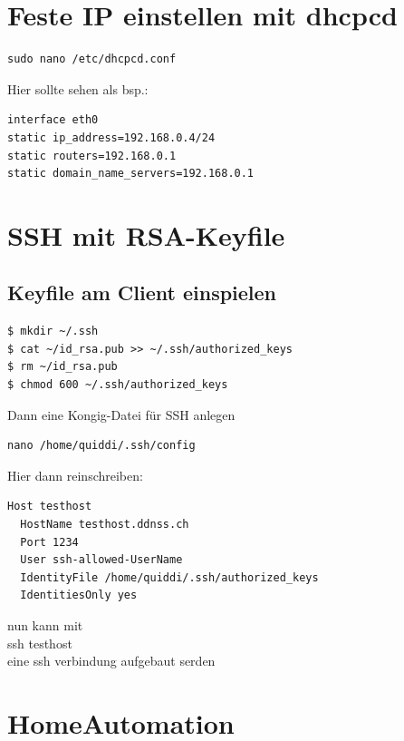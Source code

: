 \documentclass[11pt,fleqn]{book} %
\numberwithin{equation}{section} %
\numberwithin{figure}{section} %
\numberwithin{table}{section} %
\begin{document}
\chapter{Feste IP einstellen mit dhcpcd}
\begin{lstlisting}
sudo nano /etc/dhcpcd.conf
\end{lstlisting}
Hier sollte sehen als bsp.:
\begin{lstlisting}
interface eth0
static ip_address=192.168.0.4/24
static routers=192.168.0.1
static domain_name_servers=192.168.0.1
\end{lstlisting}
\chapter{SSH mit RSA-Keyfile}
\section{Keyfile am Client einspielen}
\begin{lstlisting}
$ mkdir ~/.ssh
$ cat ~/id_rsa.pub >> ~/.ssh/authorized_keys
$ rm ~/id_rsa.pub
$ chmod 600 ~/.ssh/authorized_keys
\end{lstlisting}
Dann eine Kongig-Datei für SSH anlegen
\begin{lstlisting}
nano /home/quiddi/.ssh/config
\end{lstlisting}
Hier dann reinschreiben:
\begin{lstlisting}
Host testhost
  HostName testhost.ddnss.ch
  Port 1234
  User ssh-allowed-UserName
  IdentityFile /home/quiddi/.ssh/authorized_keys
  IdentitiesOnly yes
\end{lstlisting}
nun kann mit\\ 
ssh testhost\\
eine ssh verbindung aufgebaut serden
\chapter{HomeAutomation}
\end{document}
